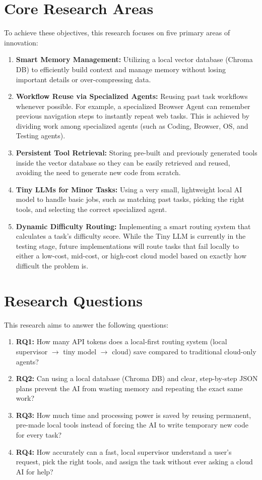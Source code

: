 \section{Core Research Areas}
To achieve these objectives, this research focuses on five primary areas of innovation:\\
\begin{enumerate}
    \item \textbf{Smart Memory Management:} Utilizing a local vector database (Chroma DB) to efficiently build context and manage memory without losing important details or over-compressing data.
    \item \textbf{Workflow Reuse via Specialized Agents:} Reusing past task workflows whenever possible. For example, a specialized Browser Agent can remember previous navigation steps to instantly repeat web tasks. This is achieved by dividing work among specialized agents (such as Coding, Browser, OS, and Testing agents).
    \item \textbf{Persistent Tool Retrieval:} Storing pre-built and previously generated tools inside the vector database so they can be easily retrieved and reused, avoiding the need to generate new code from scratch.
    \item \textbf{Tiny LLMs for Minor Tasks:} Using a very small, lightweight local AI model to handle basic jobs, such as matching past tasks, picking the right tools, and selecting the correct specialized agent.
    \item \textbf{Dynamic Difficulty Routing:} Implementing a smart routing system that calculates a task's difficulty score. While the Tiny LLM is currently in the testing stage, future implementations will route tasks that fail locally to either a low-cost, mid-cost, or high-cost cloud model based on exactly how difficult the problem is.
\end{enumerate}

\section{Research Questions}
This research aims to answer the following questions:\\
\begin{enumerate}
    \item \textbf{RQ1:} How many API tokens does a local-first routing system (local supervisor $\rightarrow$ tiny model $\rightarrow$ cloud) save compared to traditional cloud-only agents?
    \item \textbf{RQ2:} Can using a local database (Chroma DB) and clear, step-by-step JSON plans prevent the AI from wasting memory and repeating the exact same work?
    \item \textbf{RQ3:} How much time and processing power is saved by reusing permanent, pre-made local tools instead of forcing the AI to write temporary new code for every task?
    \item \textbf{RQ4:} How accurately can a fast, local supervisor understand a user's request, pick the right tools, and assign the task without ever asking a cloud AI for help?
\end{enumerate}
